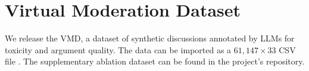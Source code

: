 %

\section{Virtual Moderation Dataset}

We release the \ac{VMD}, a dataset of synthetic discussions annotated by \acp{LLM} for toxicity and argument quality. The data can be imported as a $61,147 \times 33$ CSV file \datasetlink. The supplementary ablation dataset can be found in the project's repository\analysislink.


